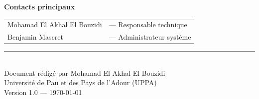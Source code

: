\documentclass[12pt, a4paper, twoside]{article}
\newcommand{\version}{1.0}
\begin{document}
\vspace{1cm}
\begin{center}
  \textbf{Contacts principaux}\\[0.5cm]
  \begin{tabular}{ll}
    Mohamad El Akhal El Bouzidi & --- Responsable technique \\
    Benjamin Mascret            & --- Administrateur système \\
  \end{tabular}
\end{center}

\vfill
\begin{center}
  \rule{0.5\textwidth}{0.4pt}\\[0.3cm]
  {\small
    Document rédigé par Mohamad El Akhal El Bouzidi\\
    Université de Pau et des Pays de l'Adour (UPPA)\\
    Version \version{} --- \today
  }
\end{center}
\end{document}
